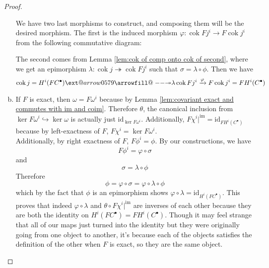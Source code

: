 \documentclass{article}
\makeatletter
\newcommand{\id}{\mathrm{id}}
\DeclareMathOperator{\im}{im}
\DeclareMathOperator{\cok}{cok}
\newcommand\xtwoheadrightarrow[2][]{%
  \ext@arrow 0579{\twoheadrightarrowfill@}{#1}{#2}}
\newcommand\twoheadrightarrowfill@{%
  \arrowfill@\relbar\relbar\twoheadrightarrow}
\makeatother
\begin{document}
\begin{proof}
\begin{enumerate}[(a)]
\begin{center}
    \end{center}
    We have two last morphisms to construct, and composing them will be the desired morphism. The first is the induced morphism $\varphi:\cok Fj^i\to F\cok j^i$ from the following commutative diagram:
        \begin{center}
    \end{center}
    The second comes from Lemma \ref{lem:cok of comp onto cok of second}, where we get an epimorphism $\lambda:\cok j \twoheadrightarrow \cok Fj^i$ such that $\sigma=\lambda \circ \phi$. Then we have
    \begin{align*}
        \cok j=H^i(FC^\bullet)\xtwoheadrightarrow{\lambda} \cok Fj^i \xrightarrow{\varphi} F\cok j^i=FH^i(C^\bullet)
    \end{align*}
    \item 
    If $F$ is exact, then $\omega=F\omega^i$ because by Lemma \ref{lem:covariant exact and commutes with im and coim}. Therefore $\theta$, the canonical inclusion from $\ker F\omega^i\hookrightarrow \ker \omega$ is actually just $\id_{\ker F\omega^i}$. Additionally, $F\chi^i\vert^{\im} =\id_{FH^i(C^\bullet)}$ because by left-exactness of $F$, $F\chi^i=\ker F\omega^i$.\\
    Additionally, by right exactness of $F$, $F\phi^i=\phi$. By our constructions, we have
    \[
    F\phi^i=\varphi\circ \sigma
    \]
    and
    \[
    \sigma=\lambda \circ \phi
    \]
    Therefore
    \[
    \phi=\varphi \circ \sigma=\varphi\circ \lambda \circ \phi
    \]
    which by the fact that $\phi$ is an epimorphism shows $\varphi \circ \lambda=\id_{H^i(FC^\bullet)}$. This proves that indeed $\varphi \circ \lambda$ and $\theta \circ F\chi^i\vert^{\im}$ are inverses of each other because they are both the identity on $H^i(FC^\bullet)=FH^i(C^\bullet)$. Though it may feel strange that all of our maps just turned into the identity but they were originally going from one object to another, it's because each of the objects satisfies the definition of the other when $F$ is exact, so they are the same object.
    \end{enumerate}
\end{proof}
\end{document}

